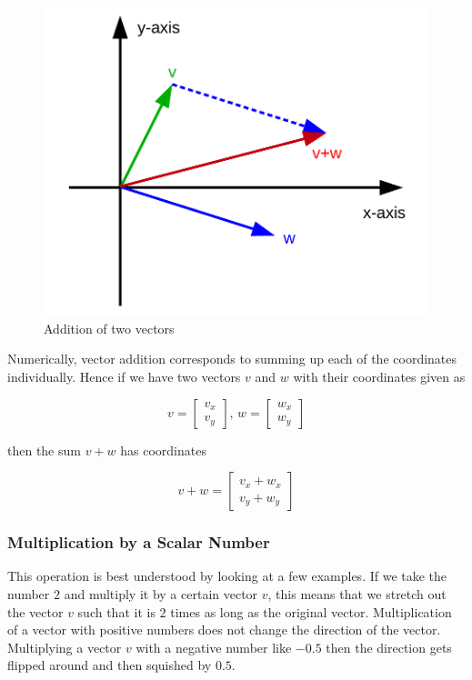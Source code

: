 \documentclass[
]{book}
\theoremstyle{definition}
\theoremstyle{definition}
\theoremstyle{definition}
\theoremstyle{remark}
\begin{document}
\begin{figure}[!ht]
\includegraphics[width=1\linewidth,]{odg/vector-sum} \caption{Addition of two vectors}\label{fig:vector-sum}
\end{figure}

Numerically, vector addition corresponds to summing up each of the coordinates individually. Hence if we have two vectors \(v\) and \(w\) with their coordinates given as

\[v = \left[\begin{array}{c} v_x \\ v_y \end{array}\right] \text{, } w = \left[\begin{array}{c} w_x \\ w_y \end{array}\right]\]

then the sum \(v+w\) has coordinates

\[v+w =  \left[\begin{array}{c} v_x + w_x \\ v_y+w_y \end{array}\right]\]

\hypertarget{intro-linalg-vector-scalar-multiplication}{%
\subsubsection{Multiplication by a Scalar Number}\label{intro-linalg-vector-scalar-multiplication}}

This operation is best understood by looking at a few examples. If we take the number \(2\) and multiply it by a certain vector \(v\), this means that we stretch out the vector \(v\) such that it is \(2\) times as long as the original vector. Multiplication of a vector with positive numbers does not change the direction of the vector. Multiplying a vector \(v\) with a negative number like \(-0.5\) then the direction gets flipped around and then squished by \(0.5\).
\end{document}
